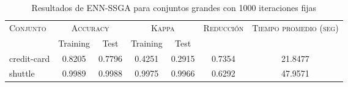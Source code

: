 \begin{table}[]
\centering
\begin{tabular}{l c c c c c c}
\hline
\multirow{2}{*}{\textsc{Conjunto}}
	& \multicolumn{2}{c}{\textsc{Accuracy}}
	& \multicolumn{2}{c}{\textsc{Kappa}}
	& \textsc{Reducción}
	& \textsc{Tiempo promedio (seg)} \\
	& Training & Test
	& Training & Test \\ 
\hline
\hline

credit-card & 0.8205 & 0.7796 & 0.4251 & 0.2915 & 0.7354 & 21.8477 \\
shuttle & 0.9989 & 0.9988 & 0.9975 & 0.9966 & 0.6292 & 47.9571 \\

\hline
\end{tabular}
\caption{Resultados de ENN-SSGA para conjuntos grandes con 1000 iteraciones fijas}
\label{res-grande-enn-ssga}
\end{table}

